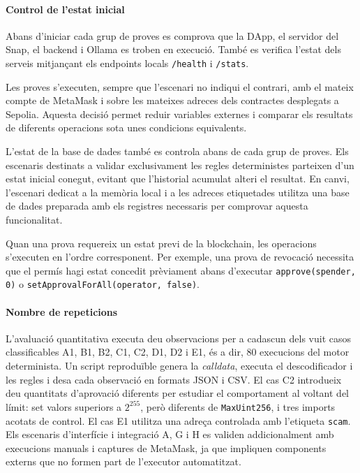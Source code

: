 \paragraph{Control de l'estat inicial}

Abans d'iniciar cada grup de proves es comprova que la DApp, el servidor del Snap, el backend i Ollama es troben en execució. També es verifica l'estat dels serveis mitjançant els endpoints locals \texttt{/health} i \texttt{/stats}.

Les proves s'executen, sempre que l'escenari no indiqui el contrari, amb el mateix compte de MetaMask i sobre les mateixes adreces dels contractes desplegats a Sepolia. Aquesta decisió permet reduir variables externes i comparar els resultats de diferents operacions sota unes condicions equivalents.

L'estat de la base de dades també es controla abans de cada grup de proves. Els escenaris destinats a validar exclusivament les regles deterministes parteixen d'un estat inicial conegut, evitant que l'historial acumulat alteri el resultat. En canvi, l'escenari dedicat a la memòria local i a les adreces etiquetades utilitza una base de dades preparada amb els registres necessaris per comprovar aquesta funcionalitat.

Quan una prova requereix un estat previ de la blockchain, les operacions s'executen en l'ordre corresponent. Per exemple, una prova de revocació necessita que el permís hagi estat concedit prèviament abans d'executar \texttt{approve(spender, 0)} o \texttt{setApprovalForAll(operator, false)}.

\paragraph{Nombre de repeticions}

L'avaluació quantitativa executa deu observacions per a cadascun dels vuit casos classificables A1, B1, B2, C1, C2, D1, D2 i E1, és a dir, 80 execucions del motor determinista. Un script reproduïble genera la \textit{calldata}, executa el descodificador i les regles i desa cada observació en formats JSON i CSV. El cas C2 introdueix deu quantitats d'aprovació diferents per estudiar el comportament al voltant del límit: set valors superiors a \(2^{255}\), però diferents de \texttt{MaxUint256}, i tres imports acotats de control. El cas E1 utilitza una adreça controlada amb l'etiqueta \texttt{scam}. Els escenaris d'interfície i integració A, G i H es validen addicionalment amb execucions manuals i captures de MetaMask, ja que impliquen components externs que no formen part de l'executor automatitzat.


